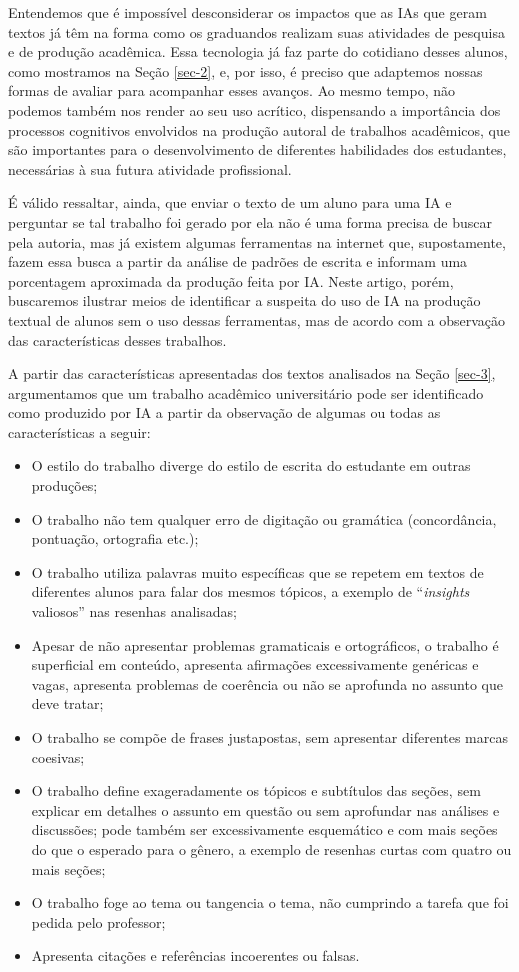 \documentclass[portuguese]{textolivre}
\begin{document}
Entendemos que é impossível desconsiderar os impactos que as IAs que geram textos já têm na forma como os graduandos realizam suas atividades de pesquisa e de produção acadêmica. Essa tecnologia já faz parte do cotidiano desses alunos, como mostramos na Seção \ref{sec-2}, e, por isso, é preciso que adaptemos nossas formas de avaliar para acompanhar esses avanços. Ao mesmo tempo, não podemos também nos render ao seu uso acrítico, dispensando a importância dos processos cognitivos envolvidos na produção autoral de trabalhos acadêmicos, que são importantes para o desenvolvimento de diferentes habilidades dos estudantes, necessárias à sua futura atividade profissional.

É válido ressaltar, ainda, que enviar o texto de um aluno para uma IA e perguntar se tal trabalho foi gerado por ela não é uma forma precisa de buscar pela autoria, mas já existem algumas ferramentas na internet que, supostamente, fazem essa busca a partir da análise de padrões de escrita e informam uma porcentagem aproximada da produção feita por IA. Neste artigo, porém, buscaremos ilustrar meios de identificar a suspeita do uso de IA na produção textual de alunos sem o uso dessas ferramentas, mas de acordo com a observação das características desses trabalhos.

A partir das características apresentadas dos textos analisados na Seção \ref{sec-3}, argumentamos que um trabalho acadêmico universitário pode ser identificado como produzido por IA a partir da observação de algumas ou todas as características a seguir:

\begin{itemize}
    \item O estilo do trabalho diverge do estilo de escrita do estudante em outras produções;
\item O trabalho não tem qualquer erro de digitação ou gramática (concordância, pontuação, ortografia etc.);
\item O trabalho utiliza palavras muito específicas que se repetem em textos de diferentes alunos para falar dos mesmos tópicos, a exemplo de ``\textit{insights} valiosos'' nas resenhas analisadas;
\item Apesar de não apresentar problemas gramaticais e ortográficos, o trabalho é superficial em conteúdo, apresenta afirmações excessivamente genéricas e vagas, apresenta problemas de coerência ou não se aprofunda no assunto que deve tratar;
\item O trabalho se compõe de frases justapostas, sem apresentar diferentes marcas coesivas;
\item O trabalho define exageradamente os tópicos e subtítulos das seções, sem explicar em detalhes o assunto em questão ou sem aprofundar nas análises e discussões; pode também ser excessivamente esquemático e com mais seções do que o esperado para o gênero, a exemplo de resenhas curtas com quatro ou mais seções;
\item O trabalho foge ao tema ou tangencia o tema, não cumprindo a tarefa que foi pedida pelo professor;
\item Apresenta citações e referências incoerentes ou falsas.
\end{itemize}
\end{document}
